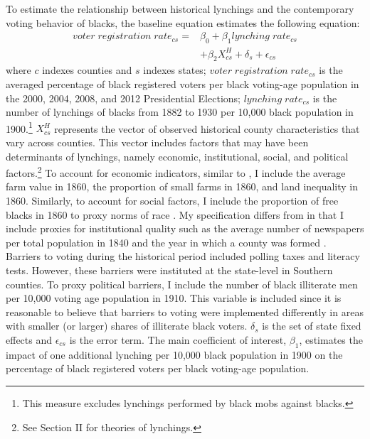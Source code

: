 \documentclass[AEJ, finalmode]{AEA}
\begin{document}
To estimate the relationship between historical lynchings and the contemporary voting behavior of blacks, the baseline equation estimates the following equation: 
\begin{equation}
\begin{aligned}
voter\;registration\;rate_{cs} = & \beta_{0} + \beta_{1}lynching\;rate_{cs} \\  & + \beta_{2}X^H_{cs} + \delta_{s} + \epsilon_{cs}
\label{olsbaseline}
\end{aligned}
\end{equation}
where $c$ indexes counties and $s$ indexes states; $voter\;registration\;rate_{cs}$ is the averaged percentage of black registered voters per black voting-age population in the 2000, 2004, 2008, and 2012 Presidential Elections; $lynching\;rate_{cs}$ is the number of lynchings of blacks from 1882 to 1930 per 10,000 black population in 1900.\footnote{This measure excludes lynchings performed by black mobs against blacks.} $X^H_{cs}$ represents the vector of observed historical county characteristics that vary across counties. This vector includes factors that may have been determinants of lynchings, namely economic, institutional, social, and political factors.\footnote{See Section II for theories of lynchings.} To account for economic indicators, similar to , I include the average farm value in 1860, the proportion of small farms in 1860, and land inequality in 1860. Similarly, to account for social factors, I include the proportion of free blacks in 1860 to proxy norms of race \cite{acharya2016political}. My specification differs from \cite{acharya2016political} in that I include proxies for institutional quality such as the average number of newspapers per total population in 1840 and the year in which a county was formed \cite{grosjean2014history}. Barriers to voting during the historical period included polling taxes and literacy tests. However, these barriers were instituted at the state-level in Southern counties. To proxy political barriers, I include the number of black illiterate men per 10,000 voting age population in 1910. This variable is included since it is reasonable to believe that barriers to voting were implemented differently in areas with smaller (or larger) shares of illiterate black voters. $\delta_{s}$ is the set of state fixed effects and $\epsilon_{cs}$ is the error term. The main coefficient of interest, $\beta_{1}$, estimates the impact of one additional lynching per 10,000 black population in 1900 on the percentage of black registered voters per black voting-age population. 
\end{document}
